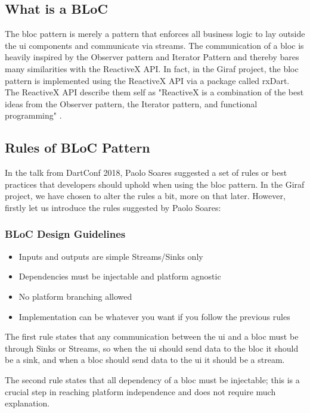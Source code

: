 \subsection{What is a BLoC}
The \gls{bloc} pattern is merely a pattern that enforces all business logic to lay outside the \gls{ui} components and communicate via streams. The communication of a \gls{bloc} is heavily inspired by the Observer pattern and Iterator Pattern and thereby bares many similarities with the ReactiveX API. In fact, in the Giraf project, the \gls{bloc} pattern is implemented using the ReactiveX API via a package called rxDart. The ReactiveX API describe them self as "ReactiveX is a combination of the best ideas from the Observer pattern, the Iterator pattern, and functional programming" \cite{ReactiveXWebsite}.

\subsection{Rules of BLoC Pattern}
In the talk from DartConf 2018, Paolo Soares suggested a set of rules or best practices that developers should uphold when using the \gls{bloc} pattern. In the Giraf project, we have chosen to alter the rules a bit, more on that later. However, firstly let us introduce the rules suggested by Paolo Soares:

\subsubsection{BLoC Design Guidelines}
\begin{itemize}
  \item Inputs and outputs are simple Streams/Sinks only
  \item Dependencies must be injectable and platform agnostic
  \item No platform branching allowed
  \item Implementation can be whatever you want if you follow the previous rules
\end{itemize}

The first rule states that any communication between the \gls{ui} and a \gls{bloc} must be through Sinks or Streams, so when the \gls{ui} should send data to the \gls{bloc} it should be a sink, and when a \gls{bloc} should send data to the \gls{ui} it should be a stream.

The second rule states that all dependency of a \gls{bloc} must be injectable; this is a crucial step in reaching platform independence and does not require much explanation.

